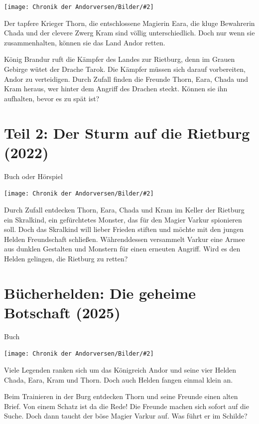 \documentclass[10pt, a4paper, oneside]{book}
\newcommand{\fillbreak}{\vspace*{\fill}\columnbreak}
\newcommand{\produkt}[1]{%
    \section{#1}%
    \label{Produkt: #1}%
}
\newcommand{\bildmitts}[2][height=0.32\textwidth,width=0.48\textwidth,keepaspectratio]{%
    \begin{center}
        \texttt{[image: Chronik der Andorversen/Bilder/\#2]}
    \end{center}
}
\begin{document}
\begin{multicols}{2}
\bildmitts{Der Fluch des roten Drachen (2021).png}

Der tapfere Krieger Thorn, die entschlossene Magierin Eara, die kluge Bewahrerin Chada und der clevere Zwerg Kram sind völlig unterschiedlich. Doch nur wenn sie zusammenhalten, können sie das Land Andor retten.

König Brandur ruft die Kämpfer des Landes zur Rietburg, denn im Grauen Gebirge wütet der Drache Tarok. Die Kämpfer müssen sich darauf vorbereiten, Andor zu verteidigen. Durch Zufall finden die Freunde Thorn, Eara, Chada und Kram heraus, wer hinter dem Angriff des Drachen steckt. Können sie ihn aufhalten, bevor es zu spät ist?





\produkt{Teil 2: Der Sturm auf die Rietburg (2022)}

\begin{center}
    Buch oder Hörspiel
\end{center}

\bildmitts{Der Sturm auf die Rietburg (2022).png}

Durch Zufall entdecken Thorn, Eara, Chada und Kram im Keller der Rietburg ein Skralkind, ein gefürchtetes Monster, das für den Magier Varkur spionieren soll. Doch das Skralkind will lieber Frieden stiften und möchte mit den jungen Helden Freundschaft schließen. Währenddessen versammelt Varkur eine Armee aus dunklen Gestalten und Monstern für einen erneuten Angriff. Wird es den Helden gelingen, die Rietburg zu retten?







\fillbreak
\produkt{Bücherhelden: Die geheime Botschaft (2025)}

\begin{center}
    Buch
\end{center}

\bildmitts{Die geheime Botschaft (2025).jpeg}

Viele Legenden ranken sich um das Königreich Andor und seine vier Helden Chada, Eara, Kram und Thorn. Doch auch Helden fangen einmal klein an.

Beim Trainieren in der Burg entdecken Thorn und seine Freunde einen alten Brief. Von einem Schatz ist da die Rede! Die Freunde machen sich sofort auf die Suche. Doch dann taucht der böse Magier Varkur auf. Was führt er im Schilde?






\end{multicols}
\end{document}
